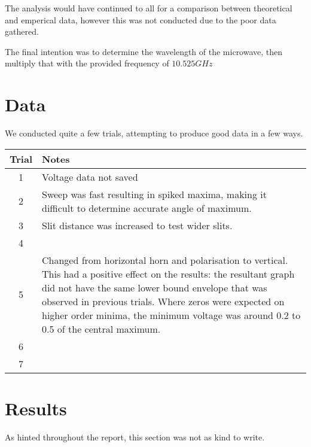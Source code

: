 The analysis would have continued to all for a comparison between theoretical and emperical data, however this was not conducted due to the poor data gathered.

The final intention was to determine the wavelength of the microwave, then multiply that with the provided frequency of $10.525 GHz$

\section*{Data}

We conducted quite a few trials, attempting to produce good data in a few ways.

\begin{center}
\begin{tabularx}{\linewidth}{ |c | X| }
 \hline
 Trial & Notes \\ 
\hline
 1 & Voltage data not saved \\ 
 2 & Sweep was fast resulting in spiked maxima, making it difficult to determine accurate angle of maximum. \\ 
 3 & Slit distance was increased to test wider slits. \\ 
 4 &  \\ 
 5 & Changed from horizontal horn and polarisation to vertical. This had a positive effect on the results: the resultant graph did not have the same lower bound envelope that was observed in previous trials. Where zeros were expected on higher order minima, the minimum voltage was around 0.2 to 0.5 of the central maximum. \\ 
 6 &  \\ 
 7 &  \\ 
 \hline
\end{tabularx}
\end{center}



\section*{Results}

As hinted throughout the report, this section was not as kind to write. 


